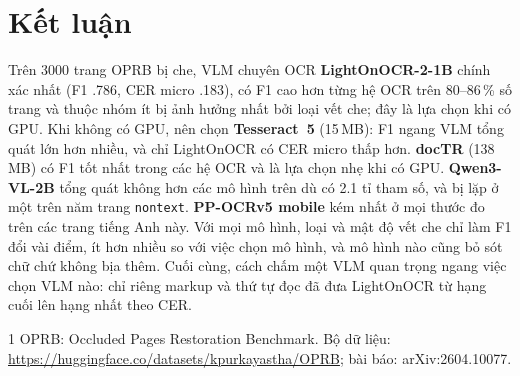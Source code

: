 \documentclass[10pt,a4paper]{article}
\begin{document}
\section{Kết luận}
Trên 3000 trang OPRB bị che, VLM chuyên OCR \textbf{LightOnOCR-2-1B} chính xác nhất (F1 .786, CER micro .183),
có F1 cao hơn từng hệ OCR trên 80--86\,\% số trang và thuộc nhóm ít bị ảnh hưởng nhất bởi loại vết che; đây là
lựa chọn khi có GPU. Khi không có GPU, nên chọn \textbf{Tesseract~5} (15\,MB): F1 ngang VLM tổng quát lớn hơn
nhiều, và chỉ LightOnOCR có CER micro thấp hơn. \textbf{docTR} (138\,MB) có F1 tốt nhất trong các hệ OCR và là
lựa chọn nhẹ khi có GPU. \textbf{Qwen3-VL-2B} tổng quát không hơn các mô hình trên dù có 2.1 tỉ tham số, và bị
lặp ở một trên năm trang \texttt{nontext}. \textbf{PP-OCRv5 mobile} kém nhất ở mọi thước đo trên các trang tiếng
Anh này. Với mọi mô hình, loại và mật độ vết che chỉ làm F1 đổi vài điểm, ít hơn nhiều so với việc chọn mô hình,
và mô hình nào cũng bỏ sót chữ chứ không bịa thêm. Cuối cùng, cách chấm một VLM quan trọng ngang việc chọn VLM
nào: chỉ riêng markup và thứ tự đọc đã đưa LightOnOCR từ hạng cuối lên hạng nhất theo CER.

\begin{thebibliography}{1}\small
{} OPRB: Occluded Pages Restoration Benchmark. Bộ dữ liệu:
\url{https://huggingface.co/datasets/kpurkayastha/OPRB}; bài báo: arXiv:2604.10077.
\end{thebibliography}
\end{document}
